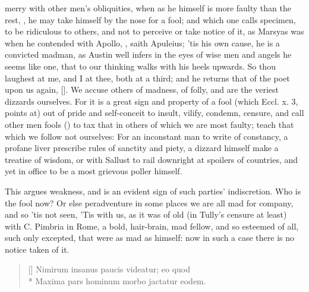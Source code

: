 {merry with other men's obliquities, when as he himself is more faulty
than the rest, , he may take
himself by the nose for a fool; and which one calls 
specimen, to be ridiculous to others, and not to perceive or take
notice of it, as Marsyas was when he contended with Apollo, , saith Apuleius; 'tis his own
cause, he is a convicted madman, as Austin well infers in the eyes
of wise men and angels he seems like one, that to our thinking walks
with his heels upwards. So thou laughest at me, and I at thee, both at
a third; and he returns that of the poet upon us again, [\baselineskip]. We accuse others of
madness, of folly, and are the veriest dizzards ourselves. For it is a
great sign and property of a fool (which Eccl. x. 3, points at) out of
pride and self-conceit to insult, vilify, condemn, censure, and call
other men fools () to tax that in
others of which we are most faulty; teach that which we follow not
ourselves: For an inconstant man to write of constancy, a profane liver
prescribe rules of sanctity and piety, a dizzard himself make a
treatise of wisdom, or with Sallust to rail downright at spoilers of
countries, and yet in office to be a most grievous poller himself.

This argues weakness, and is an evident sign of such parties'
indiscretion.  Who is the fool
now? Or else peradventure in some places we are all mad for company,
and so 'tis not seen,  'Tis with us, as it was of old (in
Tully's censure at least) with C. Pimbria in Rome, a bold,
hair-brain, mad fellow, and so esteemed of all, such only excepted,
that were as mad as himself: now in such a case there is no notice
taken of it.

\settowidth{\versewidth}{Maxima pars hominum morbo jactatur eodem.}
\begin{verse}[\versewidth]
\textlatin{Nimirum insanus paucis videatur; eo quod}\\*
\textlatin{Maxima pars hominum morbo jactatur eodem.}
\end{verse}

}
